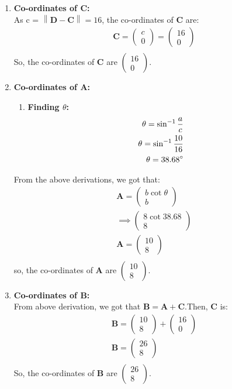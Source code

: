 \documentclass{article}
\providecommand{\norm}[1]{\left\lVert#1\right\rVert}
\newcommand{\myvec}[1]{\ensuremath{\begin{pmatrix}#1\end{pmatrix}}}
\let\vec\mathbf
\begin{document}
\begin{enumerate}
	\item \textbf{Co-ordinates of $\vec{C}$:}\\
		As c = $\norm{\vec{D} - \vec{C}} = 16$, the co-ordinates of $\vec{C}$ are:
		\begin{align}
			\vec{C} = \myvec{c\\0} = \myvec{16\\0}\\
		\end{align}
So, the co-ordinates of $\vec{C}$ are $\myvec{16\\0}$.
\item \textbf{Co-ordinates of $\vec{A}$:}\\
	\begin{enumerate}
		\item \textbf{Finding $\theta$:}\\
			\begin{align}
				\theta = \sin^{-1}\frac{a}{c}\\
				\theta = \sin^{-1}\frac{10}{16}\\
				\theta = 38.68\degree\\
			\end{align}
	\end{enumerate}
From the above derivations, we got that:\\
			\begin{align}
				\vec{A} = \myvec{b\cot{\theta}\\b}\\
				\implies \myvec{8\cot{38.68}\\8}\\
				\vec{A} = \myvec{10\\8}\\
			\end{align}
so, the co-ordinates of $\vec{A}$ are $\myvec{10\\8}$.
\item \textbf{Co-ordinates of $\vec{B}$:}\\
	From above derivation, we got that $\vec{B} = \vec{A} + \vec{C}$.Then, $\vec{C}$ is:\\
		\begin{align}
			\vec{B} = \myvec{10\\8} + \myvec{16\\0}\\
			\vec{B} = \myvec{26\\8}\\
		\end{align}
So, the co-ordinates of $\vec{B}$ are $\myvec{26\\8}$.

\end{enumerate}
\end{document}
